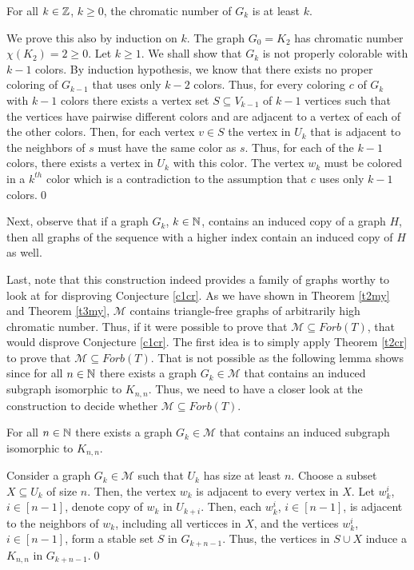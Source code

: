 \begin{thm}\label{t3my}
For all $k\in\mathbb{Z}$, $k\geq 0$, the chromatic number of $G_k$ is at least $k$.
\end{thm}
\begin{prf}
We prove this also by induction on $k$. The graph $G_0=K_2$ has chromatic number $\chi (K_2)=2 \geq 0$. Let $k\geq 1$. We shall show that $G_k$ is not properly colorable with $k-1$ colors. By induction hypothesis, we know that there exists no proper coloring of $G_{k-1}$ that uses only $k-2$ colors. Thus, for every coloring $c$ of $G_k$ with $k-1$ colors there exists a vertex set $S\subseteq V_{k-1}$ of $k-1$ vertices such that the vertices have pairwise different colors and are adjacent to a vertex of each of the other colors. Then, for each vertex $v\in S$ the vertex in $U_k$ that is adjacent to the neighbors of $s$ must have the same color as $s$. Thus, for each of the $k-1$ colors, there exists a vertex in $U_k$ with this color. The vertex $w_k$ must be colored in a $k^{th}$ color which is a contradiction to the assumption that $c$ uses only $k-1$ colors.\qed
\end{prf}

Next, observe that if a graph $G_k$, $k\in\mathbb{N}$, contains an induced copy of a graph $H$, then all graphs of the sequence with a higher index contain an induced copy of $H$ as well.

Last, note that this construction indeed provides a family of graphs worthy to look at for disproving Conjecture \ref{c1cr}. As we have shown in Theorem \ref{t2my} and Theorem \ref{t3my}, $\mathcal{M}$ contains triangle-free graphs of arbitrarily high chromatic number. Thus, if it were possible to prove that $\mathcal{M}\subseteq\textit{Forb}(T)$, that would disprove Conjecture \ref{c1cr}. The first idea is to simply apply Theorem \ref{t2cr} to prove that $\mathcal{M}\subseteq\textit{Forb}(T)$. That is not possible as the following lemma shows since for all $n\in\mathbb{N}$ there exists a graph $G_k\in\mathcal{M}$ that contains an induced subgraph isomorphic to $K_{n,n}$. Thus, we need to have a closer look at the construction to decide whether $\mathcal{M}\subseteq\textit{Forb}(T)$. 

\begin{lemma}\label{l1my}
For all $n\in\mathbb{N}$ there exists a graph $G_k\in\mathcal{M}$ that contains an induced subgraph isomorphic to $K_{n,n}$.
\end{lemma}
\begin{prf}
Consider a graph $G_k\in\mathcal{M}$ such that $U_k$ has size at least $n$. Choose a subset $X\subseteq U_k$ of size $n$. Then, the vertex $w_k$ is adjacent to every vertex in $X$. Let $w_k^{i}$, $i\in [n-1]$, denote copy of $w_k$ in $U_{k+i}$. Then, each $w_k^{i}$, $i\in [n-1]$, is adjacent to the neighbors of $w_k$, including all verticces in $X$, and the vertices $w_k^{i}$, $i\in [n-1]$, form a stable set $S$ in $G_{k+n-1}$. Thus, the vertices in $S\cup X$ induce a $K_{n,n}$ in $G_{k+n-1}$.\qed
\end{prf}

